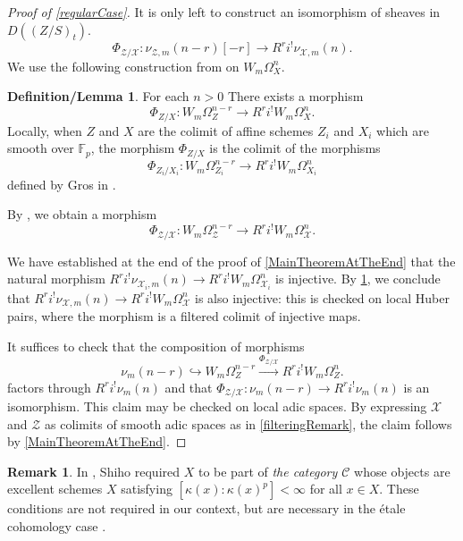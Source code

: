 \documentclass{amsart}
\theoremstyle{definition}
\newtheorem{remark}[theorem]{Remark}
\newtheorem{DefLem}[theorem]{Definition/Lemma}
\newcommand{\mX}{\mathcal{X}}
\newcommand{\mZ}{\mathcal{Z}}
\newcommand{\mF}{\mathbb{F}}
\numberwithin{equation}{section}
\begin{document}
\begin{proof}[Proof of \cref{regularCase}]

It is only left to construct an isomorphism  of sheaves in $D((Z/S)_t)$.
\[
\Phi_{\mZ/\mX}: \nu_{\mZ,m}(n-r)[-r]\to R^ri^! \nu_{\mX,m}(n).
\]
We use the following construction from  \cite[Section 3]{Shiho} on $W_m\Omega_X^n$.
\begin{DefLem}\label{DefLemAboutWOmega}
	For each $n>0$ There exists a morphism 
\[
		\Phi_{Z/X}: W_m\Omega_Z^{n-r}\to R^ri^!W_m\Omega_X^n.
\]
	Locally, when $Z$ and $X$ are the colimit of affine schemes $Z_i$ and $X_i$ which are smooth over $\mF_p$, the morphism $\Phi_{Z/X}$ is the colimit of the morphisms
	\[
	\Phi_{Z_i/X_i}: W_m\Omega_{Z_i}^{n-r}\to R^ri^!W_m\Omega_{X_i}^{n}
	\]
	defined by Gros in \cite[Subsection 3.4]{CohomologyLogGros}.
\end{DefLem}

By \cite[Lemma 8.3]{HTame}, we obtain a morphism
\begin{equation}
	\Phi_{\mZ/\mX}: W_m\Omega_{\mZ}^{n-r}\to R^ri^!W_m\Omega_{\mX}^n.
\end{equation}

We have established at the end of the proof of \cref{MainTheoremAtTheEnd} that the natural morphism $R^ri^!\nu_{\mX_i,m}(n)\to R^ri^!W_m\Omega_{\mX_i}^n$ is injective.  By \cref{DefLemAboutWOmega}, we conclude that $R^ri^!\nu_{\mX,m}(n)\to R^ri^!W_m\Omega_{\mX}^n$ is also injective: this is checked on local Huber pairs, where the morphism is a filtered colimit of injective maps.

It suffices to check that the composition of morphisms
\[
\nu_m(n-r)\hookrightarrow W_m\Omega_Z^{n-r}\xrightarrow{\Phi_{\mZ/\mX}} R^ri^!W_m\Omega_Z^{n}.
\]
factors through $R^ri^!\nu_m(n)$ and that $\Phi_{\mZ/\mX}:\nu_m(n-r)\to R^ri^!\nu_m(n)$ is an isomorphism.  This claim may be checked on local adic spaces. By expressing $\mX$ and $\mZ$ as colimits of smooth adic spaces as in \cref{filteringRemark}, the claim follows by \cref{MainTheoremAtTheEnd}.
\end{proof}
\begin{remark}
	In \cite[Theorem 3.2]{Shiho}, Shiho required $X$ to be part of \emph{the category $\mathcal{C}$} whose objects are excellent schemes $X$ satisfying $[\kappa(x):\kappa(x)^p]<\infty$ for all $x\in X$. These conditions are not required in our context, but are necessary in the étale cohomology case  \cite[Remark 3.10]{Shiho}.
\end{remark}
\end{document}
